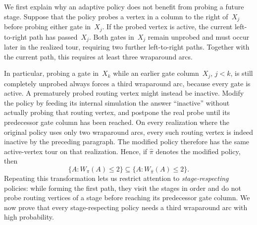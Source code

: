 \documentclass[12pt,a4paper,oneside]{report}
\begin{document}
We first explain why an adaptive policy does not benefit from probing a
future stage.  Suppose that the policy probes a vertex in a column to the
right of~$X_j$ before probing either gate in~$X_j$.  If the probed vertex is
active, the current left-to-right path has passed~$X_j$.  Both gates in~$X_j$
remain unprobed and must occur later in the realized tour, requiring two
further left-to-right paths.  Together with the current path, this requires
at least three wraparound arcs.

In particular, probing a gate in~$X_k$ while an earlier gate column~$X_j$,
$j<k$, is still completely unprobed always forces a third wraparound arc,
because every gate is active.  A prematurely probed routing vertex might instead be
inactive.  Modify the policy by feeding its internal simulation the answer
``inactive'' without actually probing that routing vertex, and postpone the real
probe until its predecessor gate column has been reached.  On every
realization where the original policy uses only two wraparound arcs, every
such routing vertex is indeed inactive by the preceding paragraph.  The modified
policy therefore has the same active-vertex tour on that realization.  Hence,
if $\widehat\pi$ denotes the modified policy, then
\[
    \{A:W_\pi(A)\le2\}
    \subseteq
    \{A:W_{\widehat\pi}(A)\le2\}.
\]
Repeating this transformation lets us restrict attention to
\emph{stage-respecting} policies: while forming the first path, they visit
the stages in order and do not probe routing vertices of a stage before
reaching its predecessor gate column.
We now prove that every stage-respecting policy needs a third wraparound arc
with high probability.
\end{document}
